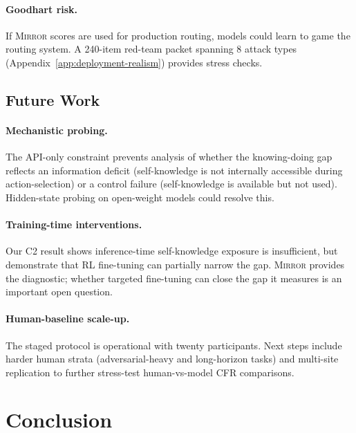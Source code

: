 \documentclass[10pt]{article}
\newcommand{\mirror}{\textsc{Mirror}}
\begin{document}
\paragraph{Goodhart risk.}
If \mirror{} scores are used for production routing, models could learn to game the routing system. A 240-item red-team packet spanning 8 attack types (Appendix~\ref{app:deployment-realism}) provides stress checks.

\subsection{Future Work}

\paragraph{Mechanistic probing.}
The API-only constraint prevents analysis of whether the knowing-doing gap reflects an information deficit (self-knowledge is not internally accessible during action-selection) or a control failure (self-knowledge is available but not used). Hidden-state probing on open-weight models could resolve this.

\paragraph{Training-time interventions.}
Our C2 result shows inference-time self-knowledge exposure is insufficient, but \citet{schmied2026greedy} demonstrate that RL fine-tuning can partially narrow the gap. \mirror{} provides the diagnostic; whether targeted fine-tuning can close the gap it measures is an important open question.

\paragraph{Human-baseline scale-up.}
The staged protocol is operational with twenty participants. Next steps include harder human strata (adversarial-heavy and long-horizon tasks) and multi-site replication to further stress-test human-vs-model CFR comparisons.

\vspace{-1mm}
\section{Conclusion}
\label{sec:conclusion}
\end{document}
